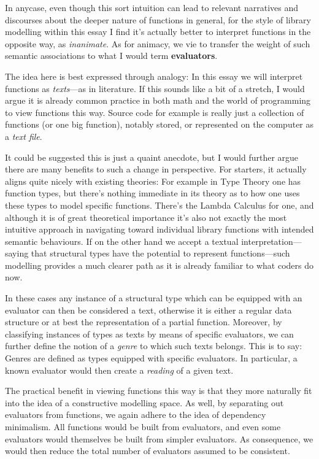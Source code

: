 \documentclass[twoside]{article}
\newcommand{\strong}[1]{{\bfseries #1}}
\begin{document}
In anycase, even though this sort intuition can lead to relevant narratives and discourses about the deeper nature
of functions in general, for the style of library modelling within this essay I find it's actually better to interpret
functions in the opposite way, as \emph{inanimate}. As for animacy, we vie to transfer the weight of such semantic
associations to what I would term \strong{evaluators}.

The idea here is best expressed through analogy: In this essay we will interpret functions as \emph{texts}---as in
literature. If this sounds like a bit of a stretch, I would argue it is already common practice in both math and the
world of programming to view functions this way. Source code for example is really just a collection of functions
(or one big function), notably stored, or represented on the computer as a \emph{text file}.

It could be suggested this is just a quaint anecdote, but I would further argue there are many benefits to such a change
in perspective. For starters, it actually aligns quite nicely with existing theories: For example in Type Theory one has
function types, but there's nothing immediate in its theory as to how one uses these types to model specific functions.
There's the Lambda Calculus for one, and although it is of great theoretical importance it's also not exactly the most
intuitive approach in navigating toward individual library functions with intended semantic behaviours. If on the
other hand we accept a textual interpretation---saying that structural types have the potential to represent
functions---such modelling provides a much clearer path as it is already familiar to what coders do now.

In these cases any instance of a structural type which can be equipped with an evaluator can then be considered a text,
otherwise it is either a regular data structure or at best the representation of a partial function. Moreover, by classifying
instances of types as texts by means of specific evaluators, we can further define the notion of a \emph{genre} to which such
texts belongs. This is to say: Genres are defined as types equipped with specific evaluators. In particular, a known evaluator
would then create a \emph{reading} of a given text.

The practical benefit in viewing functions this way is that they more naturally fit into the idea of a constructive
modelling space. As well, by separating out evaluators from functions, we again adhere to the idea of dependency
minimalism. All functions would be built from evaluators, and even some evaluators would themselves be built from
simpler evaluators. As consequence, we would then reduce the total number of evaluators assumed to be consistent.
\end{document}
